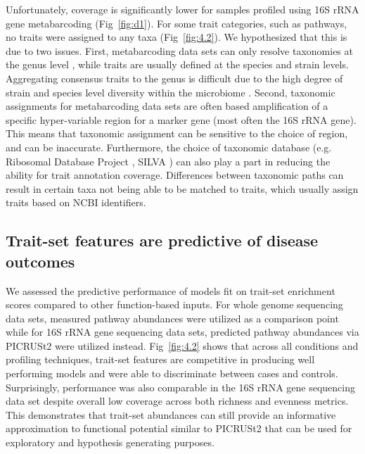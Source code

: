 Unfortunately, coverage is significantly lower for samples profiled using 16S rRNA gene metabarcoding (Fig~\ref{fig:d1}). For some trait categories, such as pathways, no traits were assigned to any taxa (Fig~\ref{fig:4.2}). We hypothesized that this is due to two issues. First, metabarcoding data sets can only resolve taxonomies at the genus level \cite{johnson2019evaluation}, while traits are usually defined at the species and strain levels. Aggregating consensus traits to the genus is difficult due to the high degree of strain and species level diversity within the microbiome \cite{carrow2020strain}. Second, taxonomic assignments for metabarcoding data sets are often based amplification of a specific hyper-variable region for a marker gene (most often the 16S rRNA gene). This means that taxonomic assignment can be sensitive to the choice of region, and can be inaccurate. Furthermore, the choice of taxonomic database (e.g. Ribosomal Database Project \cite{cole2014ribosomal}, SILVA \cite{quast2013silva}) can also play a part in reducing the ability for trait annotation coverage. Differences between taxonomic paths \cite{balvociute2017silva} can result in certain taxa not being able to be matched to traits, which usually assign traits based on NCBI identifiers.  

\subsection*{Trait-set features are predictive of disease outcomes}

We assessed the predictive performance of models fit on trait-set enrichment scores compared to other function-based inputs. For whole genome sequencing data sets, measured pathway abundances were utilized as a comparison point while for 16S rRNA gene sequencing data sets, predicted pathway abundances via PICRUSt2 were utilized instead. Fig~\ref{fig:4.2} shows that across all conditions and profiling techniques, trait-set features are competitive in producing well performing models and were able to discriminate between cases and controls. Surprisingly, performance was also comparable in the 16S rRNA gene sequencing data set despite overall low coverage across both richness and evenness metrics. This demonstrates that trait-set abundances can still provide an informative approximation to functional potential similar to PICRUSt2 that can be used for exploratory and hypothesis generating purposes.   

